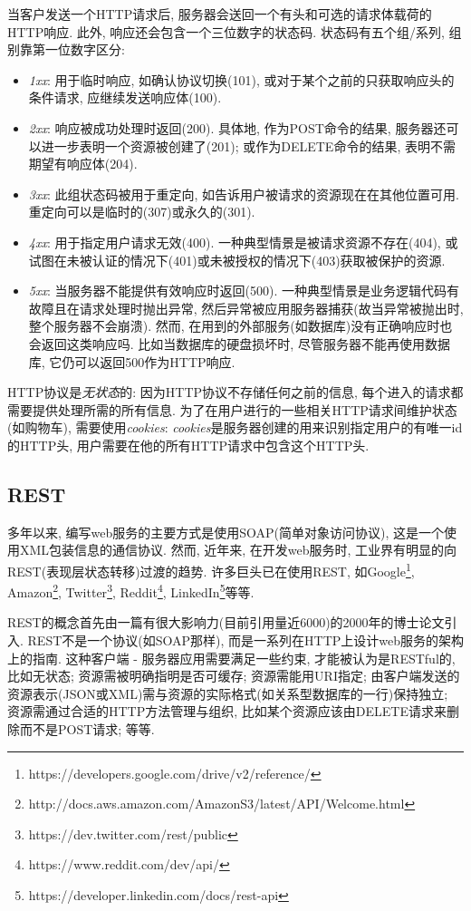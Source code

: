        当客户发送一个HTTP请求后, 服务器会送回一个有头和可选的请求体载荷的HTTP响应. 此外, 响应还会包含一个三位数字的状态码. 状态码有五个组/系列, 组别靠第一位数字区分: 
        \begin{itemize}
          \item \textit{1xx}: 用于临时响应, 如确认协议切换(101), 或对于某个之前的只获取响应头的条件请求, 应继续发送响应体(100). 
            \item \textit{2xx}: 响应被成功处理时返回(200). 具体地, 作为POST命令的结果, 服务器还可以进一步表明一个资源被创建了(201); 或作为DELETE命令的结果, 表明不需期望有响应体(204).
            \item \textit{3xx}: 此组状态码被用于重定向, 如告诉用户被请求的资源现在在其他位置可用. 重定向可以是临时的(307)或永久的(301). 
            \item \textit{4xx}: 用于指定用户请求无效(400). 一种典型情景是被请求资源不存在(404), 或试图在未被认证的情况下(401)或未被授权的情况下(403)获取被保护的资源. 
            \item \textit{5xx}: 当服务器不能提供有效响应时返回(500). 一种典型情景是业务逻辑代码有故障且在请求处理时抛出异常, 然后异常被应用服务器捕获(故当异常被抛出时, 整个服务器不会崩溃). 然而, 在用到的外部服务(如数据库)没有正确响应时也会返回这类响应吗. 比如当数据库的硬盘损坏时, 尽管服务器不能再使用数据库, 它仍可以返回500作为HTTP响应.
        \end{itemize}
    
      HTTP协议是\textit{无状态}的: 因为HTTP协议不存储任何之前的信息, 每个进入的请求都需要提供处理所需的所有信息. 为了在用户进行的一些相关HTTP请求间维护状态(如购物车), 需要使用\textit{cookies}: \textit{cookies}是服务器创建的用来识别指定用户的有唯一id的HTTP头, 用户需要在他的所有HTTP请求中包含这个HTTP头.
    
    \subsection{REST}
      多年以来, 编写web服务的主要方式是使用SOAP(简单对象访问协议), 这是一个使用XML包装信息的通信协议. 然而, 近年来, 在开发web服务时, 工业界有明显的向REST(表现层状态转移)过渡的趋势. 许多巨头已在使用REST, 如Google\footnote{https://developers.google.com/drive/v2/reference/}, Amazon\footnote{ http://docs.aws.amazon.com/AmazonS3/latest/API/Welcome.html}, Twitter\footnote{https://dev.twitter.com/rest/public}, Reddit\footnote{https://www.reddit.com/dev/api/}, LinkedIn\footnote{https://developer.linkedin.com/docs/rest-api}等等. 

    REST的概念首先由一篇有很大影响力(目前引用量近6000)的2000年的博士论文引入. REST不是一个协议(如SOAP那样), 而是一系列在HTTP上设计web服务的架构上的指南. 这种客户端 - 服务器应用需要满足一些约束, 才能被认为是RESTful的, 比如无状态; 资源需被明确指明是否可缓存; 资源需能用URI指定; 由客户端发送的资源表示(JSON或XML)需与资源的实际格式(如关系型数据库的一行)保持独立; 资源需通过合适的HTTP方法管理与组织, 比如某个资源应该由DELETE请求来删除而不是POST请求; 等等.
        

